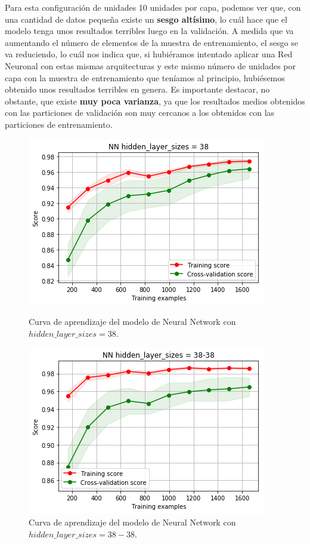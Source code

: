 \documentclass[11pt,a4paper]{article}
\begin{document}
Para esta configuración de unidades 10 unidades por capa, podemos ver que, con una cantidad de datos pequeña existe un \textbf{sesgo altísimo}, lo cuál hace
que el modelo tenga unos resultados terribles luego en la validación. A medida que va aumentando el número de elementos de la muestra de
entrenamiento, el sesgo se va reduciendo, lo cuál nos indica que, si hubiéramos intentado aplicar una Red Neuronal con estas mismas arquitecturas
y este mismo número de unidades por capa con la muestra de entrenamiento que teníamos al principio, hubiésemos obtenido unos resultados terribles
en genera. Es importante destacar, no obstante, que existe \textbf{muy poca varianza}, ya que los resultados medios obtenidos con las particiones de
validación son muy cercanos a los obtenidos con las particiones de entrenamiento.

\begin{figure}[H]
\centering
\begin{minipage}{.5\textwidth}
    \centering
    \includegraphics[scale=0.4]{img/lc-nn-38.png}
    \caption{Curva de aprendizaje del modelo de Neural Network con $hidden\_layer\_sizes=38$.}
    \label{fig:lc-nn-38}
\end{minipage}%
\begin{minipage}{.5\textwidth}
    \centering
    \includegraphics[scale=0.4]{img/lc-nn-38-38.png}
    \caption{Curva de aprendizaje del modelo de Neural Network con $hidden\_layer\_sizes=38-38$.}
    \label{fig:lc-nn-38-38}
\end{minipage}
\end{figure}
\end{document}

